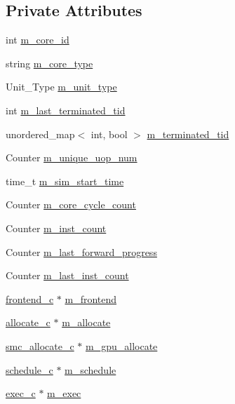 \subsection*{Private Attributes}
\begin{DoxyCompactItemize}
\item 
int \hyperlink{classcore__c_a4754ed1da4f42b4fb0d3141f2a415da2}{m\_\-core\_\-id}
\item 
string \hyperlink{classcore__c_adf344458048cd602bb5ed05704db3891}{m\_\-core\_\-type}
\item 
Unit\_\-Type \hyperlink{classcore__c_a0f67da58f3bcc6eb35040ec7b76c8e18}{m\_\-unit\_\-type}
\item 
int \hyperlink{classcore__c_a64d9467a87d78acc11074627d138d1ea}{m\_\-last\_\-terminated\_\-tid}
\item 
unordered\_\-map$<$ int, bool $>$ \hyperlink{classcore__c_a38eff33d82cef74e85cbdf7988224b3f}{m\_\-terminated\_\-tid}
\item 
Counter \hyperlink{classcore__c_aebd17d803bc985fcc24c9c552286273c}{m\_\-unique\_\-uop\_\-num}
\item 
time\_\-t \hyperlink{classcore__c_a810b0f0bcacea384f78c3a0ec0329e5a}{m\_\-sim\_\-start\_\-time}
\item 
Counter \hyperlink{classcore__c_af0b6b28e16f1e720accf21f3f4e6b345}{m\_\-core\_\-cycle\_\-count}
\item 
Counter \hyperlink{classcore__c_a4a92fed13bf3f6becb873ce1921acb4a}{m\_\-inst\_\-count}
\item 
Counter \hyperlink{classcore__c_aaeba580eada653812b7550c7805891cb}{m\_\-last\_\-forward\_\-progress}
\item 
Counter \hyperlink{classcore__c_a1cdfd88596ec0d6b7f7f0fe688f03023}{m\_\-last\_\-inst\_\-count}
\item 
\hyperlink{classfrontend__c}{frontend\_\-c} $\ast$ \hyperlink{classcore__c_aef4ae847c7137fb984b2e2fa2e2d8128}{m\_\-frontend}
\item 
\hyperlink{classallocate__c}{allocate\_\-c} $\ast$ \hyperlink{classcore__c_ae1269af11357d7b3e65eadce74086b27}{m\_\-allocate}
\item 
\hyperlink{classsmc__allocate__c}{smc\_\-allocate\_\-c} $\ast$ \hyperlink{classcore__c_a954b769fe612af32cdb0ae5ecca77774}{m\_\-gpu\_\-allocate}
\item 
\hyperlink{classschedule__c}{schedule\_\-c} $\ast$ \hyperlink{classcore__c_a50195be046236479bd8b4a9f3b46d8aa}{m\_\-schedule}
\item 
\hyperlink{classexec__c}{exec\_\-c} $\ast$ \hyperlink{classcore__c_ad39543515fdd2762eaa6cafb90691439}{m\_\-exec}

\end{DoxyCompactItemize}
